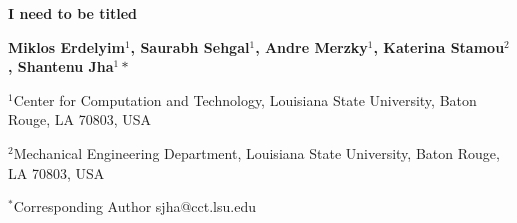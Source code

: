 \documentclass[a4paper,11pt]{article}
\begin{document}
\begin{center}
\textbf {\large \bf I need to be titled }
\vspace{14pt}

\textbf {\normalsize \hspace{0.6 in} Miklos Erdelyim$^1$, Saurabh Sehgal$^1$, Andre Merzky$^1$,  \newline Katerina Stamou$^2$, Shantenu Jha$^1*$ }

\vspace{12pt}

\normalsize { \hspace{0.6 in} $^1$Center for Computation and Technology, \newline Louisiana State University, Baton Rouge, LA 70803, USA}

\normalsize {\hspace{0.6 in} $^2$Mechanical Engineering Department, \newline Louisiana State University, Baton Rouge, LA 70803, USA}

\vspace{0.2in}
{\footnotesize {\hspace{0.0 in} $^*$Corresponding Author sjha@cct.lsu.edu}}


\vspace{12pt}
\end{center}


\vspace{12pt}
\end{document}

